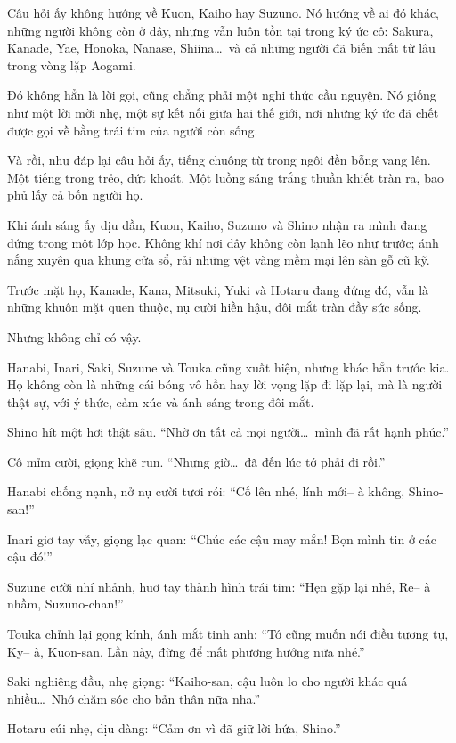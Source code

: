 \documentclass[../main.tex]{subfiles}
\begin{document}
Câu hỏi ấy không hướng về Kuon, Kaiho hay Suzuno. Nó hướng về ai đó khác, những người không còn ở đây, nhưng vẫn luôn tồn tại trong ký ức cô: Sakura, Kanade, Yae, Honoka, Nanase, Shiina\dots\ và cả những người đã biến mất từ lâu trong vòng lặp Aogami.

Đó không hẳn là lời gọi, cũng chẳng phải một nghi thức cầu nguyện. Nó giống như một lời mời nhẹ, một sự kết nối giữa hai thế giới, nơi những ký ức đã chết được gọi về bằng trái tim của người còn sống.

Và rồi, như đáp lại câu hỏi ấy, tiếng chuông từ trong ngôi đền bỗng vang lên. Một tiếng trong trẻo, dứt khoát. Một luồng sáng trắng thuần khiết tràn ra, bao phủ lấy cả bốn người họ.

Khi ánh sáng ấy dịu dần, Kuon, Kaiho, Suzuno và Shino nhận ra mình đang đứng trong một lớp học. Không khí nơi đây không còn lạnh lẽo như trước; ánh nắng xuyên qua khung cửa sổ, rải những vệt vàng mềm mại lên sàn gỗ cũ kỹ.


Trước mặt họ, Kanade, Kana, Mitsuki, Yuki và Hotaru đang đứng đó, vẫn là những khuôn mặt quen thuộc, nụ cười hiền hậu, đôi mắt tràn đầy sức sống.

Nhưng không chỉ có vậy.

Hanabi, Inari, Saki, Suzune và Touka cũng xuất hiện, nhưng khác hẳn trước kia. Họ không còn là những cái bóng vô hồn hay lời vọng lặp đi lặp lại, mà là người thật sự, với ý thức, cảm xúc và ánh sáng trong đôi mắt.

Shino hít một hơi thật sâu. ``Nhờ ơn tất cả mọi người\dots\ mình đã rất hạnh phúc.''

Cô mỉm cười, giọng khẽ run. ``Nhưng giờ\dots\ đã đến lúc tớ phải đi rồi.''

Hanabi chống nạnh, nở nụ cười tươi rói: ``Cố lên nhé, lính mới-- à không, Shino-san!''

Inari giơ tay vẫy, giọng lạc quan: ``Chúc các cậu may mắn! Bọn mình tin ở các cậu đó!''

Suzune cười nhí nhảnh, huơ tay thành hình trái tim: ``Hẹn gặp lại nhé, Re-- à nhầm, Suzuno-chan!''

Touka chỉnh lại gọng kính, ánh mắt tinh anh: ``Tớ cũng muốn nói điều tương tự, Ky-- à, Kuon-san. Lần này, đừng để mất phương hướng nữa nhé.''

Saki nghiêng đầu, nhẹ giọng: ``Kaiho-san, cậu luôn lo cho người khác quá nhiều\dots\ Nhớ chăm sóc cho bản thân nữa nha.''

Hotaru cúi nhẹ, dịu dàng: ``Cảm ơn vì đã giữ lời hứa, Shino.''
\end{document}
